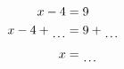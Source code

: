 \documentclass[varwidth]{standalone}
\begin{document}
    \begin{varwidth}{0.25\paperwidth}
    \begin{align*}
    x - 4 &= 9\\
    x - 4 + \dotuline{\hspace{4mm}} &= 9 + \dotuline{\hspace{4mm}}\\
    x &= \dotuline{\hspace{4mm}}\\
\end{align*}
\end{varwidth}
\end{document}
